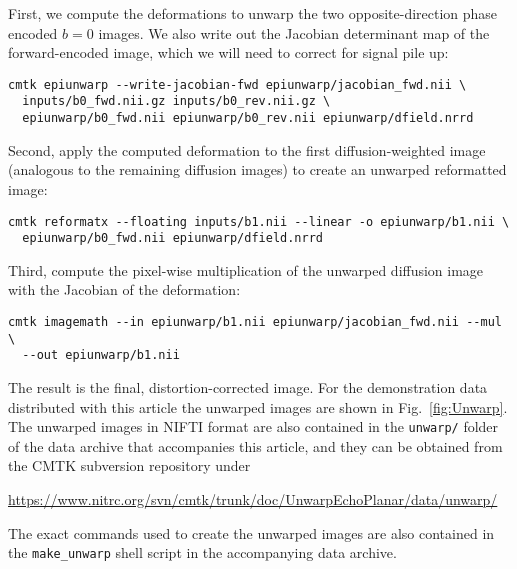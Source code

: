 \documentclass{InsightArticle}
\begin{document}
First, we compute the deformations to unwarp the two opposite-direction phase
encoded $b=0$ images. We also write out the Jacobian determinant map of the
forward-encoded image, which we will need to correct for signal pile up:
\begin{verbatim}
cmtk epiunwarp --write-jacobian-fwd epiunwarp/jacobian_fwd.nii \
  inputs/b0_fwd.nii.gz inputs/b0_rev.nii.gz \
  epiunwarp/b0_fwd.nii epiunwarp/b0_rev.nii epiunwarp/dfield.nrrd
\end{verbatim}
Second, apply the computed deformation to the first diffusion-weighted image
(analogous to the remaining diffusion images) to create an unwarped
reformatted image:
\begin{verbatim}
cmtk reformatx --floating inputs/b1.nii --linear -o epiunwarp/b1.nii \
  epiunwarp/b0_fwd.nii epiunwarp/dfield.nrrd
\end{verbatim}
Third, compute the pixel-wise multiplication of the unwarped diffusion image
with the Jacobian of the deformation:
\begin{verbatim}
cmtk imagemath --in epiunwarp/b1.nii epiunwarp/jacobian_fwd.nii --mul \
  --out epiunwarp/b1.nii
\end{verbatim}
The result is the final, distortion-corrected image. For the demonstration
data distributed with this article the unwarped images are shown in
Fig.~\ref{fig:Unwarp}. The unwarped images in NIFTI format are also
contained in the \verb|unwarp/| folder of the data archive that accompanies
this article, and they can be obtained from the CMTK subversion repository
under

\centerline{\url{https://www.nitrc.org/svn/cmtk/trunk/doc/UnwarpEchoPlanar/data/unwarp/}}

The exact commands used to create the unwarped images are also contained in
the \verb|make_unwarp| shell script in the accompanying data archive.
\end{document}
